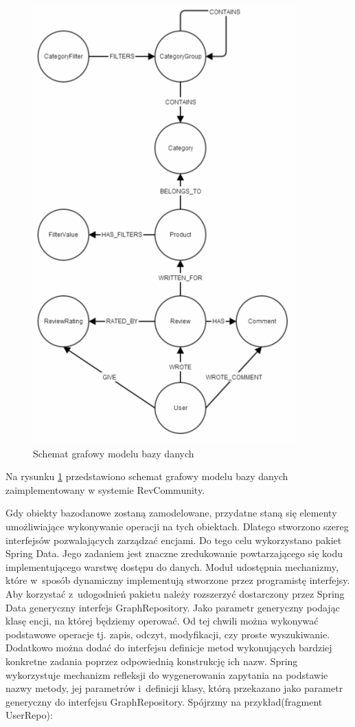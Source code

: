 \begin{figure}[H]
	\centering
	\includegraphics{images/db1.png}
	\caption{Schemat grafowy modelu bazy danych}
	\label{fig:db1}
\end{figure}

Na rysunku \ref{fig:db1} przedstawiono schemat grafowy modelu bazy danych zaimplementowany w systemie RevCommunity.

Gdy obiekty bazodanowe zostaną zamodelowane, przydatne staną się elementy umożliwiające wykonywanie operacji na tych obiektach. Dlatego stworzono szereg interfejsów pozwalających zarządzać encjami. Do tego celu wykorzystano pakiet Spring Data. Jego zadaniem jest znaczne zredukowanie powtarzającego się kodu implementującego warstwę dostępu do danych. Moduł udostępnia mechanizmy, które w~sposób dynamiczny implementują stworzone przez programistę interfejsy. Aby korzystać z~udogodnień pakietu należy rozszerzyć dostarczony przez Spring Data generyczny interfejs GraphRepository. Jako parametr generyczny podając klasę encji, na której będziemy operować. Od tej chwili można wykonywać podstawowe operacje tj. zapis, odczyt, modyfikacji, czy proste wyszukiwanie. Dodatkowo można dodać do interfejsu definicje metod wykonujących bardziej konkretne zadania poprzez odpowiednią konstrukcję ich nazw. Spring wykorzystuje mechanizm refleksji do wygenerowania zapytania na podstawie nazwy metody, jej parametrów i~definicji klasy, którą przekazano jako parametr generyczny do interfejsu GraphRepository. Spójrzmy na przykład(fragment UserRepo)\cite{repoWww}:

